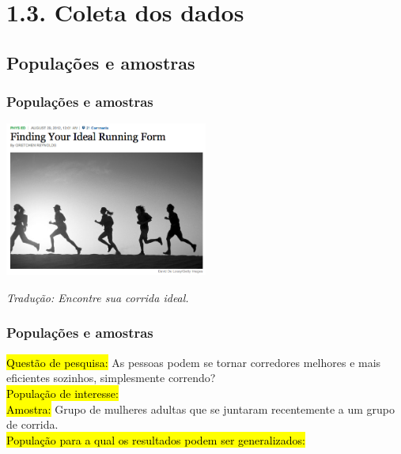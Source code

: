 
\section{1.3. Coleta dos dados}


\subsection{Populações e amostras}


\begin{frame}
\frametitle{Populações e amostras}


\begin{center}
\includegraphics[width=0.5\textwidth]{1-3_data_collection_principles/figures/running.png}
\end{center}
\vspace{-0.5cm}
{\tiny {}}

\vspace{1cm}
\small{\textit{Tradução: Encontre sua corrida ideal.}}

\end{frame}

\begin{frame}
\frametitle{Populações e amostras}
{
\justifying
\hl{Questão de pesquisa:} As pessoas podem se tornar corredores melhores e mais eficientes sozinhos, simplesmente correndo? \\
}
\vspace{0.5cm}
{
\justifying
\pause 
\justifying
\hl{População de interesse:} 
}
\pause 
\justifying
$\:$ \\
\vspace{0.5cm}
\justifying
\hl{Amostra:} Grupo de mulheres adultas que se juntaram recentemente a um grupo de corrida.\\
\vspace{0.5cm}
\pause
\justifying
\hl{População para a qual os resultados podem ser generalizados:} 

\end{frame}

